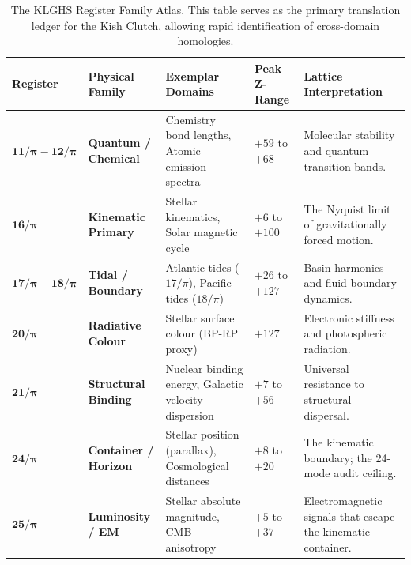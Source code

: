 \documentclass[12pt,oneside]{book}
\begin{document}
\begin{table}[H]
\centering
\renewcommand{\arraystretch}{1.5}
\small
\begin{tabular}{|>{\centering\arraybackslash}p{2cm}|>{\raggedright\arraybackslash}p{3.5cm}|>{\raggedright\arraybackslash}p{4cm}|>{\centering\arraybackslash}p{2cm}|>{\raggedright\arraybackslash}p{3.5cm}|}
\hline
\rowcolor{blue!10}
\textbf{Register} & \textbf{Physical Family} & \textbf{Exemplar Domains} & \textbf{Peak Z-Range} & \textbf{Lattice Interpretation} \\
\hline\hline

$\mathbf{11/\pi - 12/\pi}$ & \textbf{Quantum / Chemical} & Chemistry bond lengths, Atomic emission spectra & $+59$ to $+68$ & Molecular stability and quantum transition bands. \\
\hline

$\mathbf{16/\pi}$ & \textbf{Kinematic Primary} & Stellar kinematics, Solar magnetic cycle & $+6$ to $+100$ & The Nyquist limit of gravitationally forced motion. \\
\hline

$\mathbf{17/\pi - 18/\pi}$ & \textbf{Tidal / Boundary} & Atlantic tides ($17/\pi$), Pacific tides ($18/\pi$) & $+26$ to $+127$ & Basin harmonics and fluid boundary dynamics. \\
\hline

$\mathbf{20/\pi}$ & \textbf{Radiative Colour} & Stellar surface colour (BP-RP proxy) & $+127$ & Electronic stiffness and photospheric radiation. \\
\hline

$\mathbf{21/\pi}$ & \textbf{Structural Binding} & Nuclear binding energy, Galactic velocity dispersion & $+7$ to $+56$ & Universal resistance to structural dispersal. \\
\hline

$\mathbf{24/\pi}$ & \textbf{Container / Horizon} & Stellar position (parallax), Cosmological distances & $+8$ to $+20$ & The kinematic boundary; the 24-mode audit ceiling. \\
\hline

$\mathbf{25/\pi}$ & \textbf{Luminosity / EM} & Stellar absolute magnitude, CMB anisotropy & $+5$ to $+37$ & Electromagnetic signals that escape the kinematic container. \\
\hline
\end{tabular}
\caption{The KLGHS Register Family Atlas. This table serves as the primary translation ledger for the Kish Clutch, allowing rapid identification of cross-domain homologies.}
\label{tab:register_atlas}
\end{table}
\end{document}
